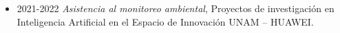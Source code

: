 \begin{itemize}
\item 2021-2022 \textit{Asistencia al monitoreo ambiental}, Proyectos de investigación en Inteligencia Artificial en el Espacio de Innovación UNAM – HUAWEI.
\end{itemize}
